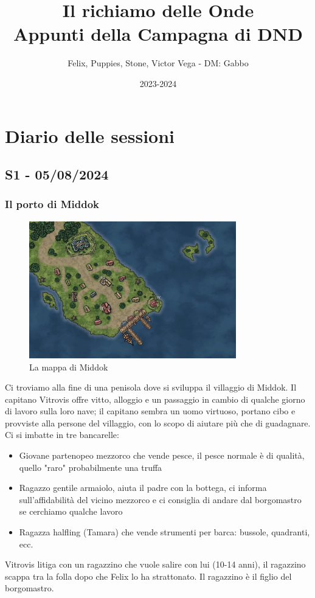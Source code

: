 \documentclass[letterpaper,twocolumn,openany,justified, nodeprecatedcode, nomultitoc]{dndbook}
\title{Il richiamo delle Onde \\
\large Appunti della Campagna di DND}
\author{Felix, Puppies, Stone, Victor Vega - DM: Gabbo}
\date{2023-2024}
\begin{document}
\frontmatter

\maketitle

\tableofcontents


\mainmatter%

\chapter{Diario delle sessioni}


\section{S1 - 05/08/2024}
\subsection{Il porto di Middok}
\begin{figure}
\centering
\includegraphics[width=9cm]{./mappe/mappa-middok.png}
\caption{La mappa di Middok}
\label{middok}
\end{figure}


Ci troviamo alla fine di una penisola dove si sviluppa il villaggio di Middok.
Il capitano Vitrovis offre vitto, alloggio e un passaggio in cambio di qualche giorno di lavoro sulla loro nave; il capitano sembra un uomo virtuoso, portano cibo e provviste alla persone del villaggio, con lo scopo di aiutare più che di guadagnare.
Ci si imbatte in tre bancarelle:
\begin{itemize}
  \item Giovane partenopeo mezzorco che vende pesce, il pesce normale è di qualità, quello "raro" probabilmente una truffa
  \item Ragazzo gentile armaiolo, aiuta il padre con la bottega, ci informa sull'affidabilità del vicino mezzorco e ci consiglia di andare dal borgomastro se cerchiamo qualche lavoro
  \item Ragazza halfling (Tamara) che vende strumenti per barca: bussole, quadranti, ecc.
\end{itemize}
Vitrovis litiga con un ragazzino che vuole salire con lui (10-14 anni), il ragazzino scappa tra la folla dopo che Felix lo ha strattonato. Il ragazzino è il figlio del borgomastro.
\end{document}
